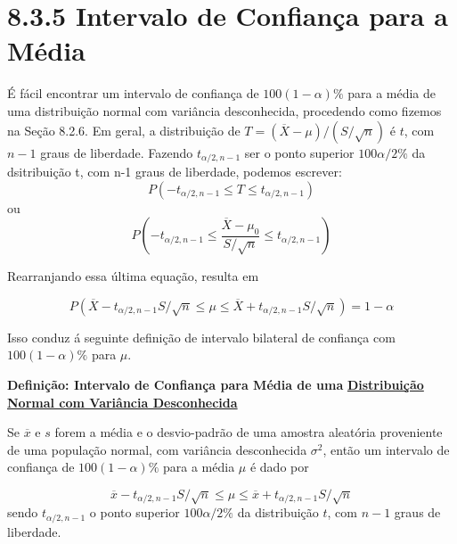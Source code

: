 \documentclass[a4paper,12pt]{article} %
\begin{document}
	\section*{8.3.5 Intervalo de Confiança para a Média}
	É fácil encontrar um intervalo de confiança de $100(1- \alpha)\%$ para a média de uma distribuição normal com variância desconhecida, procedendo como fizemos na Seção 8.2.6. Em geral, a distribuição de $T= \left( \overline{X} - \mu \right) / \left( S/ \sqrt{n} \right)  $ é $t$, com $n-1$ graus de liberdade. Fazendo $t_{\alpha / 2, n-1}$ ser o ponto superior $100 \alpha / 2 \%$ da dsitribuição t, com n-1 graus de liberdade, podemos escrever:
	\begin{equation*}
		P\left( -t_{\alpha / 2, n-1} \leq T \leq t_{\alpha / 2, n-1} \right) 
	\end{equation*}
	ou
	\begin{equation*}
		P\left( -t_{\alpha / 2, n-1} \leq  \frac{\overline{X} - \mu_0}{S/ \sqrt{n}} \leq t_{\alpha / 2, n-1} \right) 
	\end{equation*}

	Rearranjando essa última equação, resulta em
	
	\begin{equation*}
		\tag{8.49}
		P\left(\overline{X} -t_{\alpha / 2, n-1}S/ \sqrt{n} \leq  \mu \leq \overline{X} + t_{\alpha / 2, n-1}S/ \sqrt{n} \right) = 1- \alpha
	\end{equation*}

	Isso conduz á seguinte definição de intervalo bilateral de confiança com  $100 \left(1- \alpha \right)  \%$ para $ \mu $.
	
	\begin{blockquote}
		\begin{center}
			\textbf{Definição: Intervalo de Confiança para Média de uma} \textbf{\underline{Distribuição Normal com Variância Desconhecida}}  
		\end{center}
		
		Se $\overline{x}$ e $s$ forem a média e o desvio-padrão de uma amostra aleatória proveniente de uma população normal, com variância desconhecida $\sigma^2$, então um intervalo de confiança de $100 \left(1- \alpha \right)  \%$ para a média $\mu$ é dado por
		
		\begin{equation*}
			\tag{8.50}
			\overline{x} -t_{\alpha / 2, n-1}S/ \sqrt{n} \leq  \mu \leq \overline{x} + t_{\alpha / 2, n-1}S/ \sqrt{n}
		\end{equation*}
		sendo $ t_{\alpha / 2, n-1} $ o ponto superior $100 \alpha / 2 \%$ da distribuição $t$, com $n-1$ graus de liberdade.
	\end{blockquote}
\end{document}
